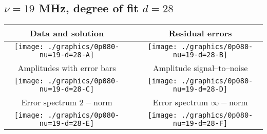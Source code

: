 

% 

\clearpage{}
\break{}

\subsection{$\nu = 19$ MHz, degree of fit $d = 28$}

\begin{table}[h]
    \begin{center}
        \begin{tabular}{ccc}
            Data and solution & \quad & Residual errors \\\hline
            \texttt{[image: ./graphics/0p080-nu=19-d=28-A]} &&
            \texttt{[image: ./graphics/0p080-nu=19-d=28-B]} \\[15pt]
            Amplitudes with error bars && Amplitude signal--to--noise \\\hline
            \texttt{[image: ./graphics/0p080-nu=19-d=28-C]} &&
            \texttt{[image: ./graphics/0p080-nu=19-d=28-D]} \\[15pt]
            Error spectrum $2-$norm && Error spectrum $\infty-$norm \\\hline
            \texttt{[image: ./graphics/0p080-nu=19-d=28-E]} &&
            \texttt{[image: ./graphics/0p080-nu=19-d=28-F]} \\[15pt]
        \end{tabular}
    \end{center}
\label{fig:elev=80, nu=19}
\end{table}



\endinput
